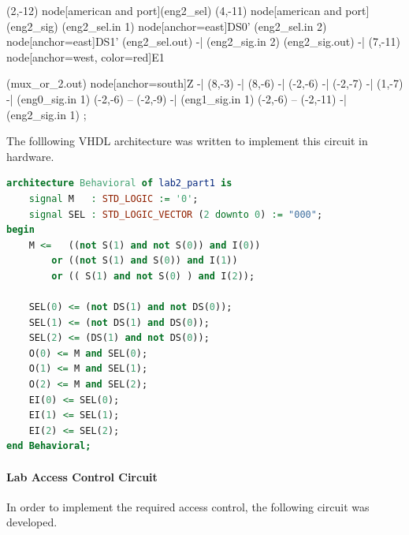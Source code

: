\documentclass{article}
\begin{document}
\begin{circuitikz}[scale=0.75, transform shape]
            (2,-12) node[american and port](eng2_sel){}
            (4,-11) node[american and port](eng2_sig){}
            (eng2_sel.in 1) node[anchor=east]{DS0'}
            (eng2_sel.in 2) node[anchor=east]{DS1'}
            (eng2_sel.out) -| (eng2_sig.in 2){}
            (eng2_sig.out) -| (7,-11) node[anchor=west, color=red]{E1}


            (mux_or_2.out) node[anchor=south]{Z} -| (8,-3) -| (8,-6)
            -| (-2,-6) -| (-2,-7) -| (1,-7) -| (eng0_sig.in 1)
            (-2,-6) -- (-2,-9) -| (eng1_sig.in 1)
            (-2,-6) -- (-2,-11) -| (eng2_sig.in 1)
        ;
    \end{circuitikz}

    The folllowing VHDL architecture was written to implement this circuit in hardware.

    \begin{lstlisting}[language=VHDL]
architecture Behavioral of lab2_part1 is
    signal M   : STD_LOGIC := '0';
    signal SEL : STD_LOGIC_VECTOR (2 downto 0) := "000";
begin
    M <=   ((not S(1) and not S(0)) and I(0))
        or ((not S(1) and S(0)) and I(1))
        or (( S(1) and not S(0) ) and I(2));
    
    SEL(0) <= (not DS(1) and not DS(0));
    SEL(1) <= (not DS(1) and DS(0));
    SEL(2) <= (DS(1) and not DS(0)); 
    O(0) <= M and SEL(0);
    O(1) <= M and SEL(1);
    O(2) <= M and SEL(2);
    EI(0) <= SEL(0);
    EI(1) <= SEL(1);
    EI(2) <= SEL(2);
end Behavioral;
    \end{lstlisting}
    \newpage

    \paragraph{Lab Access Control Circuit}
    In order to implement the required access control, the following circuit was developed.
\end{document}
